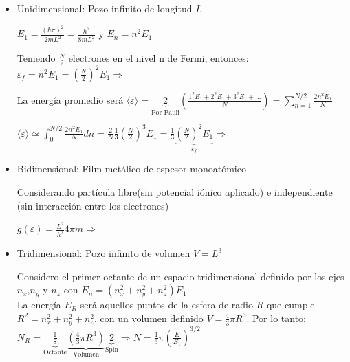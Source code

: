 \documentclass[oneside]{book}
\numberwithin{equation}{section}
\numberwithin{figure}{section}
\numberwithin{table}{section}
\begin{document}
				\begin{itemize}
				
					\item Unidimensional: Pozo infinito de longitud $L$
						\begin{center}
							$\displaystyle E_1=\frac{(\hbar \pi)^2}{2mL^2}=\frac{h^2}{8mL^2}$ y $\displaystyle E_n=n^2 E_1$
						\end{center}
				
						Teniendo $\frac{N}{2}$ electrones en el nivel n de Fermi, entonces: $\displaystyle \varepsilon_f=n^2E_1=\left(\frac{N}{2}\right)^2 E_1 \Rightarrow$ 
						
					
						La energía promedio será $\displaystyle \langle \varepsilon \rangle=\underbrace{2}_{\text{Por Pauli}}\left(\frac{1^2 E_1+2^2 E_1+3^2 E_1+\ldots}{N}\right)=\sum_{n=1}^{N/2} \frac{2n^2 E_1}{N}$\\
						
						\begin{center}
							$\displaystyle \langle \varepsilon \rangle \simeq \int_0^{N/2}\frac{2n^2 E_1}{N} dn=\frac{2}{N}\frac{1}{3}\left(\frac{N}{2}\right)^3 E_1=\frac{1}{3}\underbrace{\left(\frac{N}{2}\right)^2 E_1}_{\varepsilon_f} \Rightarrow $	
						\end{center}
					
					\item Bidimensional: Film metálico de espesor monoatómico
					
					Considerando partícula libre(sin potencial iónico aplicado) e independiente (sin interacción entre los electrones)
					
						\begin{center}
							$\displaystyle g(\varepsilon)=\frac{L^2}{h^2}4\pi m \Rightarrow $ 
						\end{center}					
					
					
					\item Tridimensional: Pozo infinito de volumen $V=L^3$
					
						Considero el primer octante de un espacio tridimensional definido por los ejes $n_x$,$n_y$ y $n_z$ con $E_n=(n_x^2+n_y^2+n_z^2)E_1$\\
						
						La energía $E_R$ será aquellos puntos de la esfera de radio $R$ que cumple $R^2=n_x^2+n_y^2+n_z^2$, con un volumen definido $V=\frac{4}{3}\pi R^3$. Por lo tanto: $\displaystyle N_R=\underbrace{\frac{1}{8}}_{\text{Octante}} \underbrace{\left( \frac{4}{3} \pi R^3\right)}_{\text{Volumen}} \underbrace{2}_{\text{Spin}} \Rightarrow N=\frac{1}{3}\pi \left( \frac{E}{E_1}\right)^{3/2}$\\
						

\end{itemize}
\end{document}
